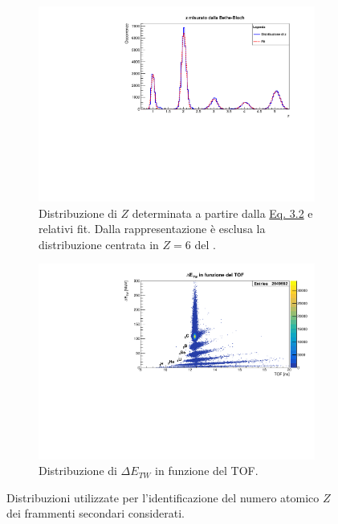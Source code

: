 \documentclass[12pt,a4paper,twoside]{report}
\begin{document}
	\begin{figure}[H]
		\centering
		\begin{subfigure}[t]{1.\textwidth}
			\centering
			\includegraphics[width=\textwidth, scale=0.50]{c_z.pdf}
			\caption{Distribuzione di $Z$ determinata a partire dalla \hyperref[eq:atomic_number]{Eq. 3.2} e relativi fit. Dalla rappresentazione è esclusa la distribuzione centrata in $Z=6$ del .}
			\label{fig:atomic_numbersa}
		\end{subfigure}
		\par
		\begin{subfigure}[t]{1.\textwidth}
			\centering
			\includegraphics[width=\textwidth, scale=0.50]{c_E_TOF.pdf}
			\caption{Distribuzione di $\Delta E_{TW}$ in funzione del TOF.}
			\label{fig:atomic_numbersb}
		\end{subfigure}
		\caption{Distribuzioni utilizzate per l'identificazione del numero atomico $Z$ dei frammenti secondari considerati.}
		\label{fig:atomic_numbers}
	\end{figure}
	
\end{document}
